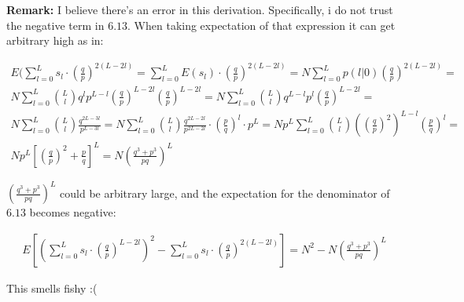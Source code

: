 \documentclass[11pt,draft]{article}
\begin{document}
 \textbf{Remark: }  I believe there's an error in this derivation.  Specifically, i do not trust the negative term in $6.13$.  When taking expectation of that expression it can get arbitrary high as in:
 
  \begin{align}
E(\sum_{l=0}^{L} s_l \cdot  \left ( \frac{q}{p} \right )^ {2(L - 2l)} = \sum_{l=0}^{L} E(s_l)  \cdot  \left ( \frac{q}{p} \right )^ {2(L - 2l)} = N \sum_{l=0}^{L}  p(l|0) \left ( \frac{q}{p} \right )^ {2(L - 2l)} = \\
N  \sum_{l=0}^{L}  \binom{L}{l} q^lp^{L-l} \left (  \frac{q}{p} \right )^ {L - 2l}  \left (  \frac{q}{p} \right )^ {L - 2l} = N   \sum_{l=0}^{L}  \binom{L}{l} q^{L-l}p^l  \left (  \frac{q}{p} \right )^ {L - 2l} = \\
 N   \sum_{l=0}^{L}  \binom{L}{l}  \frac{q^{2L-3l} } { p^{L-3l} } = N   \sum_{l=0}^{L}  \binom{L}{l}  \frac{q^{2L-2l} } { p^{2L-2l} } \cdot   \left (  \frac{p}{q} \right )^l \cdot p^L = Np^L  \sum_{l=0}^{L}  \binom{L}{l}     \left (    \left (  \frac{q}{p} \right )^2   \right )^{L-l}  \left (  \frac{p}{q} \right )^l = \\
 Np^L \left [     \left (  \frac{q}{p} \right )^2 +  \frac{p}{q}  \right ]^L = N \left ( \frac{q^3 + p^3}{pq} \right )^L
 \end{align}
 
 $  \left ( \frac{q^3 + p^3}{pq} \right )^L $ could be arbitrary large, and the expectation for the denominator of  $6.13$ becomes negative:
 
  \begin{align}
E \left [  \left ( \sum_{l=0}^{L} s_l \cdot  \left ( \frac{q}{p} \right )^ {L - 2l}  \right )^2 -  \sum_{l=0}^{L} s_l \cdot  \left ( \frac{q}{p} \right )^ {2(L - 2l)} \right ] = N^2 -  N \left ( \frac{q^3 + p^3}{pq} \right )^L
 \end{align}
 
 This smells fishy :(   
\end{document}
